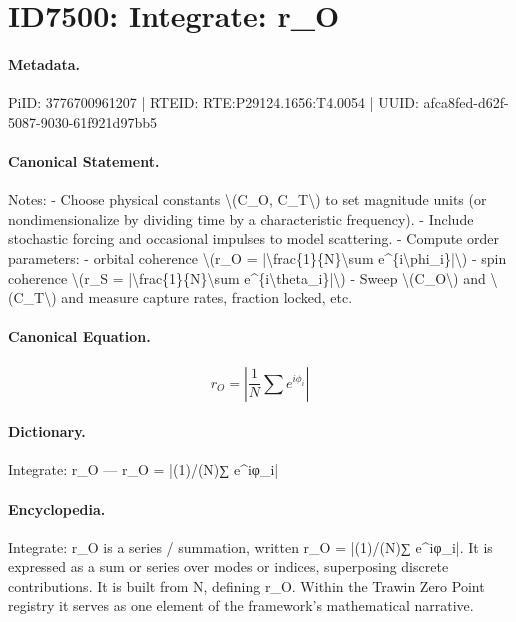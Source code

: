 \section*{ID7500: Integrate: r\_O}
\paragraph{Metadata.}
PiID: 3776700961207 | RTEID: RTE:P29124.1656:T4.0054 | UUID: afca8fed-d62f-5087-9030-61f921d97bb5

\paragraph{Canonical Statement.}
Notes: - Choose physical constants \textbackslash{}(C\_O, C\_T\textbackslash{}) to set magnitude units (or nondimensionalize by dividing time by a characteristic frequency). - Include stochastic forcing and occasional impulses to model scattering. - Compute order parameters: - orbital coherence \textbackslash{}(r\_O = |\textbackslash{}frac\{1\}\{N\}\textbackslash{}sum e\textasciicircum{}\{i\textbackslash{}phi\_i\}|\textbackslash{}) - spin coherence \textbackslash{}(r\_S = |\textbackslash{}frac\{1\}\{N\}\textbackslash{}sum e\textasciicircum{}\{i\textbackslash{}theta\_i\}|\textbackslash{}) - Sweep \textbackslash{}(C\_O\textbackslash{}) and \textbackslash{}(C\_T\textbackslash{}) and measure capture rates, fraction locked, etc.

\paragraph{Canonical Equation.}
\[
r_O = |\frac{1}{N}\sum e^{i\phi_i}|
\]

\paragraph{Dictionary.}
Integrate: r\_O — r\_O = |(1)/(N)∑ e\textasciicircum{}iφ\_i|

\paragraph{Encyclopedia.}
Integrate: r\_O is a series / summation, written r\_O = |(1)/(N)∑ e\textasciicircum{}iφ\_i|. It is expressed as a sum or series over modes or indices, superposing discrete contributions. It is built from N, defining r\_O. Within the Trawin Zero Point registry it serves as one element of the framework's mathematical narrative.
